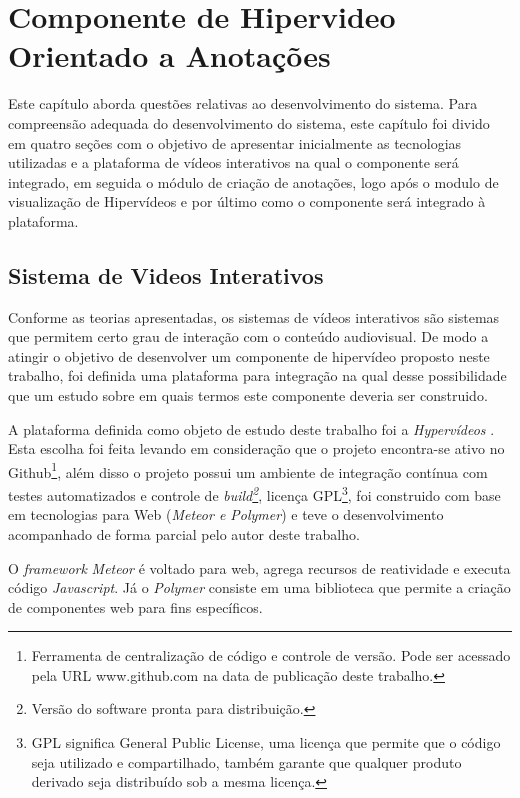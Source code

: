 \chapter[Componente de Hipervideo Orientado a Anotações]{Componente de Hipervideo Orientado a Anotações}

Este capítulo aborda questões relativas ao desenvolvimento do sistema. Para compreensão adequada do desenvolvimento do sistema, este capítulo foi divido em quatro seções com o objetivo de apresentar inicialmente as tecnologias utilizadas e a plataforma de vídeos interativos na qual o componente será integrado, em seguida o módulo de criação de anotações, logo após o modulo de visualização de Hipervídeos e por último como o componente será integrado à plataforma.

\section{Sistema de Videos Interativos}

Conforme as teorias apresentadas, os sistemas de vídeos interativos são sistemas que permitem certo grau de interação com o conteúdo audiovisual. De modo a atingir o objetivo de desenvolver um componente de hipervídeo proposto neste trabalho, foi definida uma plataforma para integração na qual desse possibilidade que um estudo sobre em quais termos este componente deveria ser construido.

A plataforma definida como objeto de estudo deste trabalho foi a \textit{Hypervídeos} \cite{arthurtcc}. Esta escolha foi feita levando em consideração que o projeto encontra-se ativo no Github\footnote{Ferramenta de centralização de código e controle de versão. Pode ser acessado pela URL www.github.com na data de publicação deste trabalho.}, além disso o projeto possui um ambiente de integração contínua com testes automatizados e controle de \textit{build\footnote{Versão do software pronta para distribuição.}}, licença GPL\footnote{GPL significa General Public License, uma licença que permite que o código seja utilizado e compartilhado, também garante que qualquer produto derivado seja distribuído sob a mesma licença.}, foi construido com base em tecnologias para Web (\textit{Meteor e Polymer}) e teve o desenvolvimento acompanhado de forma parcial pelo autor deste trabalho.

O \textit{framework} \textit{Meteor} é voltado para web, agrega recursos de reatividade e executa código \textit{Javascript}. Já o \textit{Polymer} consiste em uma biblioteca que permite a criação de componentes web para fins específicos.

